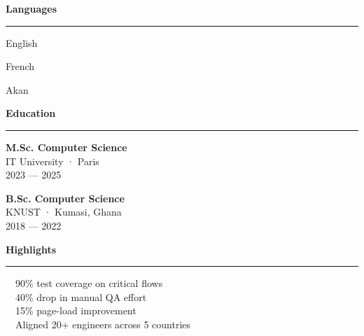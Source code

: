 \documentclass[10pt,a4paper]{article}
\newcommand{\sidesection}[1]{%
  \vspace{10pt}%
  {\displayfont\bfseries\fontsize{12}{14}\selectfont\color{white} #1}\par
  {\color{accent}\rule{2.2cm}{1.2pt}}\par
  \vspace{4pt}
}
\begin{document}
\begin{minipage}[t]{6.2cm}
\begin{minipage}{5.0cm}
  \sidesection{Languages}
  \footnotesize
  \color{white!90}
  English {\color{accent}\faCircle\faCircle\faCircle\faCircle\faCircle}\par
  French \hspace{0.45em} {\color{accent}\faCircle\faCircle\faCircle\faCircle}\faCircle[regular]\par
  Akan \hspace{0.85em} {\color{accent}\faCircle\faCircle\faCircle\faCircle\faCircle}\par

  \sidesection{Education}
  \footnotesize\color{white!90}
  \textbf{M.Sc. Computer Science}\\
  IT University · Paris\\
  {\color{white!60}\monofont\scriptsize 2023 — 2025}\par
  \vspace{6pt}
  \textbf{B.Sc. Computer Science}\\
  KNUST · Kumasi, Ghana\\
  {\color{white!60}\monofont\scriptsize 2018 — 2022}

  \sidesection{Highlights}
  \footnotesize\color{white!90}
  {\color{accent}\faTrophy}\ \ 90\% test coverage on critical flows\\[2pt]
  {\color{accent}\faRocket}\ \ 40\% drop in manual QA effort\\[2pt]
  {\color{accent}\faBolt}\ \ 15\% page-load improvement\\[2pt]
  {\color{accent}\faUsers}\ \ Aligned 20+ engineers across 5 countries

  \end{minipage}
\end{minipage}\hfill
\end{document}
